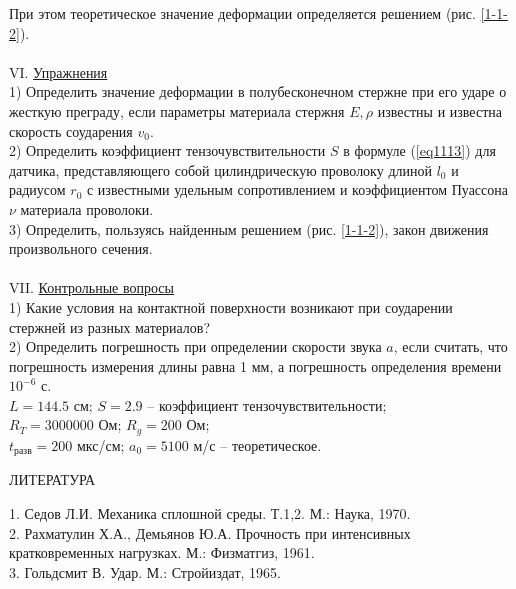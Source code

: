 \documentclass[specialist, subf, href, colorlinks=true, 14pt, final]{disser}
\theoremstyle{definition}
\begin{document}
При этом теоретическое значение деформации определяется решением (рис. \ref{1-1-2}).\\
\\
VI. \underline{Упражнения}\\
1) Определить значение деформации в полубесконечном стержне при его ударе о жесткую преграду, если параметры материала стержня $E, \rho$ известны и известна скорость соударения $v_0$.\\
2) Определить коэффициент тензочувствительности $S$ в формуле (\ref{eq1113}) для датчика, представляющего собой цилиндрическую проволоку длиной $l_0$ и радиусом $r_0$ с известными удельным сопротивлением и коэффициентом Пуассона $\nu$ материала проволоки.\\
3) Определить, пользуясь найденным решением (рис. \ref{1-1-2}), закон движения произвольного сечения.\\
\\
VII. \underline{Контрольные вопросы}\\
1) Какие условия на контактной поверхности возникают при соударении стержней из разных материалов?\\
2) Определить погрешность при определении скорости звука $a$, если считать, что погрешность измерения длины равна 1 мм, а погрешность определения времени $10^{-6}$ с.\\
$L = 144.5$ см; $S = 2.9$ -- коэффициент тензочувствительности;\\
$R_{T} = 3000000$ Ом; $R_{g} = 200$ Ом;\\
$t_{\text{разв}} = 200$ мкс/см; $a_{0} = 5100$ м/с -- теоретическое.\\
\begin{center}
ЛИТЕРАТУРА
\end{center}
1. Седов Л.И. Механика сплошной среды. Т.1,2. М.: Наука, 1970.\\
2. Рахматулин Х.А., Демьянов Ю.А. Прочность при интенсивных кратковременных нагрузках. М.: Физматгиз, 1961.\\
3. Гольдсмит В. Удар. М.: Стройиздат, 1965.\\
\end{document}

